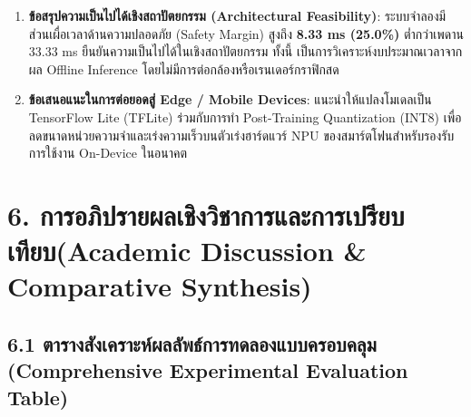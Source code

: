 \documentclass[12pt,a4paper]{article}
\begin{document}
\begin{ansbox}[fontupper=\small, left=6pt, right=6pt, top=3pt, bottom=3pt]
\begin{enumerate}[leftmargin=14pt, itemsep=1.5pt, topsep=1pt, parsep=0pt]
    \item \textbf{ข้อสรุปความเป็นไปได้เชิงสถาปัตยกรรม (Architectural Feasibility)}:
    ระบบจำลองมีส่วนเผื่อเวลาด้านความปลอดภัย (Safety Margin) สูงถึง \textbf{8.33 ms (25.0\%)} ต่ำกว่าเพดาน 33.33 ms ยืนยันความเป็นไปได้ในเชิงสถาปัตยกรรม ทั้งนี้ เป็นการวิเคราะห์งบประมาณเวลาจากผล Offline Inference โดยไม่มีการต่อกล้องหรือเรนเดอร์กราฟิกสด
    \item \textbf{ข้อเสนอแนะในการต่อยอดสู่ Edge / Mobile Devices}:
    แนะนำให้แปลงโมเดลเป็น TensorFlow Lite (TFLite) ร่วมกับการทำ Post-Training Quantization (INT8) เพื่อลดขนาดหน่วยความจำและเร่งความเร็วบนตัวเร่งฮาร์ดแวร์ NPU ของสมาร์ตโฟนสำหรับรองรับการใช้งาน On-Device ในอนาคต
\end{enumerate}
\end{ansbox}

\section*{6. การอภิปรายผลเชิงวิชาการและการเปรียบเทียบ\newline \large(Academic Discussion \& Comparative Synthesis)}

\subsection*{6.1 ตารางสังเคราะห์ผลลัพธ์การทดลองแบบครอบคลุม\\ \normalsize(Comprehensive Experimental Evaluation Table)}
\end{document}
